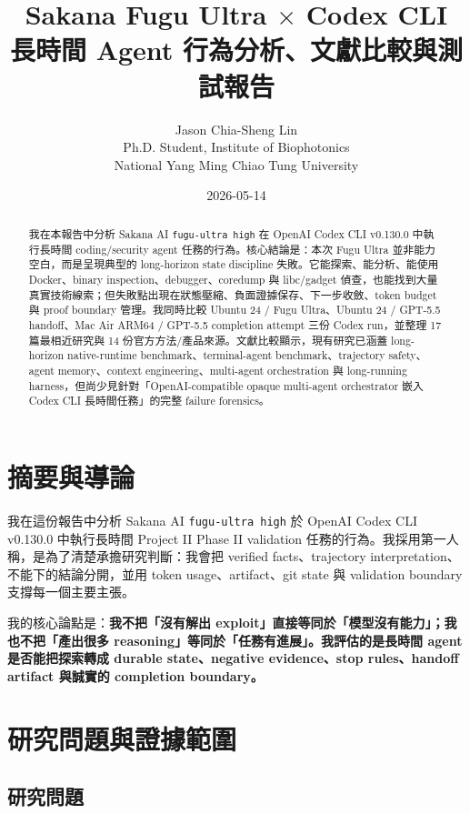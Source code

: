 \documentclass[UTF8,a4paper,11pt]{ctexart}
\title{\bfseries Sakana Fugu Ultra \texorpdfstring{$\times$}{x} Codex CLI\\長時間 Agent 行為分析、文獻比較與測試報告}
\author{Jason Chia-Sheng Lin\\\small Ph.D. Student, Institute of Biophotonics\\\small National Yang Ming Chiao Tung University}
\date{2026-05-14}
\newcommand{\code}[1]{\texttt{#1}}
\newcommand{\finding}[1]{\textbf{#1}}
\begin{document}
\maketitle

\begin{abstract}
我在本報告中分析 Sakana AI \code{fugu-ultra high} 在 OpenAI Codex CLI v0.130.0 中執行長時間 coding/security agent 任務的行為。核心結論是：本次 Fugu Ultra 並非能力空白，而是呈現典型的 long-horizon state discipline 失敗。它能探索、能分析、能使用 Docker、binary inspection、debugger、coredump 與 libc/gadget 偵查，也能找到大量真實技術線索；但失敗點出現在狀態壓縮、負面證據保存、下一步收斂、token budget 與 proof boundary 管理。我同時比較 Ubuntu 24 / Fugu Ultra、Ubuntu 24 / GPT-5.5 handoff、Mac Air ARM64 / GPT-5.5 completion attempt 三份 Codex run，並整理 17 篇最相近研究與 14 份官方方法/產品來源。文獻比較顯示，現有研究已涵蓋 long-horizon native-runtime benchmark、terminal-agent benchmark、trajectory safety、agent memory、context engineering、multi-agent orchestration 與 long-running harness，但尚少見針對「OpenAI-compatible opaque multi-agent orchestrator 嵌入 Codex CLI 長時間任務」的完整 failure forensics。
\end{abstract}

\tableofcontents
\newpage

\section{摘要與導論}

我在這份報告中分析 Sakana AI \code{fugu-ultra high} 於 OpenAI Codex CLI v0.130.0 中執行長時間 Project II Phase II validation 任務的行為。我採用第一人稱，是為了清楚承擔研究判斷：我會把 verified facts、trajectory interpretation、不能下的結論分開，並用 token usage、artifact、git state 與 validation boundary 支撐每一個主要主張。

我的核心論點是：\finding{我不把「沒有解出 exploit」直接等同於「模型沒有能力」；我也不把「產出很多 reasoning」等同於「任務有進展」。我評估的是長時間 agent 是否能把探索轉成 durable state、negative evidence、stop rules、handoff artifact 與誠實的 completion boundary。}

\section{研究問題與證據範圍}

\subsection{研究問題}
\end{document}
